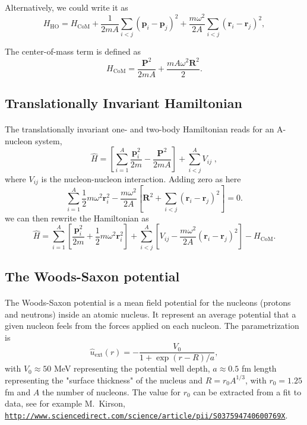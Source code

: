 \documentclass[%
twoside,                 %
final,                   %
10pt]{article}
\begin{document}
Alternatively, we could write it as	
\[
 H_{\mathrm{HO}}= H_{\mathrm{CoM}}+\frac{1}{2mA}\sum_{i < j}(\bm{p}_i-\bm{p}_j)^2
	    +\frac{m\omega^2}{2A}\sum_{i < j}(\bm{r}_i-\bm{r}_j)^2,
 \]

The center-of-mass term is defined as
 \[
      H_{\mathrm{CoM}}= \frac{\bm{P}^2}{2mA}+\frac{mA\omega^2\bm{R}^2}{2}.
 \]




\subsection*{Translationally Invariant Hamiltonian}

\paragraph{}
 The translationally invariant one- and two-body  Hamiltonian reads for an A-nucleon system,
 \[
\label{eq:ham}
\hat{H}=\left[\sum_{i=1}^A\frac{\bm{p}_i^2}{2m} -\frac{\bm{P}^2}{2mA}\right] +\sum_{i < j}^A V_{ij} \; ,
 \]
 where $V_{ij}$ is the nucleon-nucleon interaction. Adding zero as here
\[
 \sum_{i=1}^A\frac{1}{2}m\omega^2\bm{r}_i^2-
 \frac{m\omega^2}{2A}\left[\bm{R}^2+\sum_{i < j}(\bm{r}_i-\bm{r}_j)^2\right]=0.
 \]
we can then rewrite the Hamiltonian as 
\[
 \hat{H}=\sum_{i=1}^A \left[ \frac{\bm{p}_i^2}{2m}
 +\frac{1}{2}m\omega^2 \bm{r}^2_i
 \right] + \sum_{i < j}^A \left[ V_{ij}-\frac{m\omega^2}{2A}
 (\bm{r}_i-\bm{r}_j)^2
 \right]-H_{\mathrm{CoM}}.
 \]




\subsection*{The Woods-Saxon potential}

\paragraph{}
The Woods-Saxon potential is a mean field potential for the nucleons (protons and neutrons) 
inside an atomic nucleus. It represent an average potential that a given nucleon feels from  the forces applied on each nucleon. 
The parametrization is
\[
\hat{u}_{\mathrm{ext}}(r)=-\frac{V_0}{1+\exp{(r-R)/a}},
\]
with $V_0\approx 50$ MeV representing the potential well depth, $a\approx 0.5$ fm 
length representing the "surface thickness" of the nucleus and $R=r_0A^{1/3}$, with $r_0=1.25$ fm and $A$ the number of nucleons.
The value for $r_0$ can be extracted from a fit to data, see for example M.~Kirson, \href{{http://www.sciencedirect.com/science/article/pii/S037594740600769X}}{\nolinkurl{http://www.sciencedirect.com/science/article/pii/S037594740600769X}}.
\end{document}
